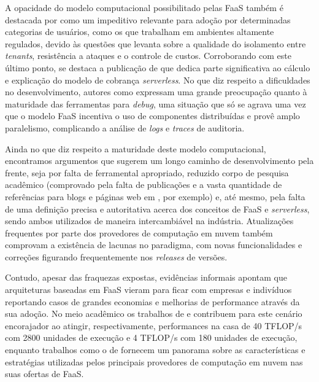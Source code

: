 \documentclass[english,brazilian]{UNISINOSmonografia} %
\begin{document}
A opacidade do modelo computacional possibilitado pelas FaaS também é destacada por  como um impeditivo relevante para adoção por determinadas categorias de usuários, como os que trabalham em ambientes altamente regulados, devido às questões que levanta sobre a qualidade do isolamento entre \textit{tenants}, resistência a ataques e o controle de custos.
Corroborando com este último ponto, se destaca a publicação de  que dedica parte significativa ao cálculo e explicação do modelo de cobrança \textit{serverless}.
No que diz respeito a dificuldades no desenvolvimento, autores como  expressam uma grande preocupação quanto à maturidade das ferramentas para \textit{debug}, uma situação que só se agrava uma vez que o modelo FaaS incentiva o uso de componentes distribuídas e provê amplo paralelismo, complicando a análise de \textit{logs} e \textit{traces} de auditoria.


Ainda no que diz respeito a maturidade deste modelo computacional, encontramos argumentos que sugerem um longo caminho de desenvolvimento pela frente, seja por falta de ferramental apropriado, reduzido corpo de pesquisa acadêmico (comprovado pela falta de publicações e a vasta quantidade de referências para blogs e páginas web em \cite{Wang2018}, por exemplo) e, até mesmo, pela falta de uma definição precisa e autoritativa acerca dos conceitos de FaaS e \textit{serverless}, sendo ambos utilizados de maneira intercambiável na indústria.
Atualizações frequentes por parte dos provedores de computação em nuvem também comprovam a existência de lacunas no paradigma, com novas funcionalidades e correções figurando frequentemente nos \textit{releases} de versões.



Contudo, apesar das fraquezas expostas, evidências informais apontam que arquiteturas baseadas em FaaS vieram para ficar com empresas e indivíduos reportando casos de grandes economias e melhorias de performance através da sua adoção.
No meio acadêmico os trabalhos de  e  contribuem para este cenário encorajador ao atingir, respectivamente, performances na casa de 40 TFLOP/s com 2800 unidades de execução e  4 TFLOP/s com 180 unidades de execução, enquanto trabalhos como o de  fornecem um panorama sobre as características e estratégias utilizadas pelos principais provedores de computação em nuvem nas suas ofertas de FaaS.
\end{document}
